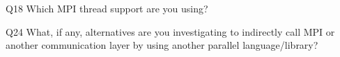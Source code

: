 \begin{description}%
\item{Q18} Which MPI thread support are you using?%
\item{Q24} What, if any, alternatives are you investigating to indirectly call MPI or another communication layer by using another parallel language/library?%
\end{description}%
